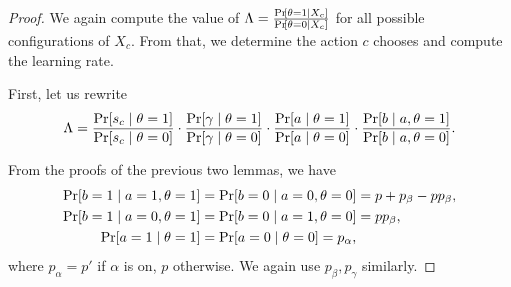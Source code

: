 \begin{proof}
    We again compute the value of $\Lambda = \frac{\Pr\!\left[ \theta = 1 \mid X_c \right]}{\Pr\!\left[ \theta = 0 \mid X_c \right]}$ for all possible configurations of $ X_c $.
    From that, we determine the action $ c $ chooses and compute the learning rate.

    First, let us rewrite \[
        \Lambda = \frac{\pr{s_c \mid \theta = 1}}{\pr{s_c \mid \theta = 0}} \cdot \frac{\pr{\gamma \mid \theta = 1}}{\pr{\gamma \mid \theta = 0}} \cdot \frac{\pr{a \mid \theta = 1}}{\pr{a \mid \theta = 0}} \cdot \frac{\pr{b \mid a,\theta = 1}}{\pr{b \mid a,\theta = 0}}.
    \]

    From the proofs of the previous two lemmas, we have \begin{align*}
        \Pr\!\left[ b = 1 \mid a = 1, \theta = 1 \right] &= \Pr\!\left[ b = 0 \mid a = 0, \theta = 0 \right] = p + p_\beta - pp_\beta, \\
        \Pr\!\left[ b = 1 \mid a = 0, \theta = 1 \right] &= \Pr\!\left[ b = 0 \mid a = 1, \theta = 0 \right] = pp_\beta, \\
        \Pr\!\left[ a = 1 \mid \theta = 1 \right] &= \Pr\!\left[ a = 0 \mid \theta = 0 \right] = p_\alpha, \\
    \end{align*}
    where $ p_\alpha = p' $ if $ \alpha  $ is on, $ p $ otherwise.
    We again use $ p_\beta, p_\gamma  $ similarly.


\end{proof}
